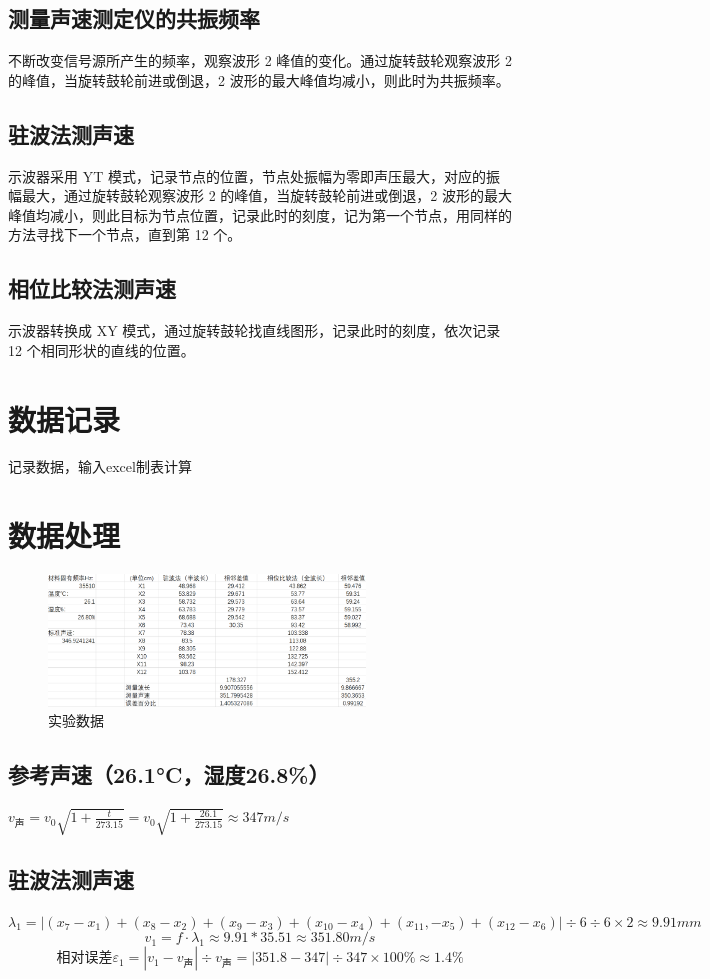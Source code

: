 \documentclass[12pt,a4paper]{article}
\begin{document}
		\subsection{测量声速测定仪的共振频率}
		不断改变信号源所产生的频率，观察波形 2 峰值的变化。通过旋转鼓轮观察波形 2 的峰值，当旋转鼓轮前进或倒退，2 波形的最大峰值均减小，则此时为共振频率。
		\subsection{驻波法测声速}
		示波器采用 YT 模式，记录节点的位置，节点处振幅为零即声压最大，对应的振幅最大，通过旋转鼓轮观察波形 2 的峰值，当旋转鼓轮前进或倒退，2 波形的最大峰值均减小，则此目标为节点位置，记录此时的刻度，记为第一个节点，用同样的方法寻找下一个节点，直到第 12 个。
		\subsection{相位比较法测声速}
		示波器转换成 XY 模式，通过旋转鼓轮找直线图形，记录此时的刻度，依次记录 12 个相同形状的直线的位置。

	\section{数据记录}
		记录数据，输入excel制表计算

	\section{数据处理}
		\begin{figure}[H]
			\centering
			\includegraphics[width=0.75\textwidth]{数据.png} %
			\caption{实验数据}
			\label{fig:example}
		\end{figure}

		\subsection{参考声速（26.1°C，湿度26.8\%）}
			$v_{声} = v_0 \sqrt{1+\frac{t}{273.15}} = v_0 \sqrt{1+\frac{26.1}{273.15}} \approx 347 m/s  $
		\subsection{驻波法测声速}
			$\lambda_{1}=|(x_{7}-x_{1})+(x_{8}-x_{2})+(x_{9}-x_{3})+(x_{10}-x_{4})+(x_{11},-x_{5})+(x_{12}-x_{6})|\div6\div6\times 2 \approx 9.91 mm$
			$$v_{1} = f \cdot \lambda_{1} \approx 9.91*35.51 \approx 351.80 m/s$$
			$$相对误差\varepsilon_{1}=|v_1-v_{声}| \div v_{声} = |351.8-347| \div 347 \times 100 \% \approx 1.4\% $$
\end{document}
